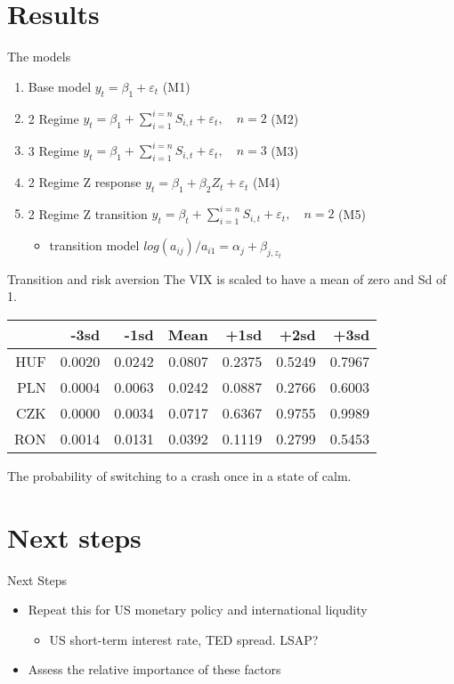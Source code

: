 \documentclass[14pt,xcolor=pdftex,dvipsnames,table]{beamer}
\begin{document}
\section{Results}
\begin{frame}{The models}
\begin{enumerate}[<+-| alert@+>]
\item Base model $y_t = \beta_1 + \varepsilon_t$ (M1)
\item 2 Regime $y_t = \beta_1 + \sum_{i=1}^{i=n}S_{i,t} + \varepsilon_t, \quad n = 2$ (M2) 
\item 3 Regime $y_t = \beta_1 + \sum_{i=1}^{i=n}S_{i,t} + \varepsilon_t, \quad n = 3$ (M3)
\item 2 Regime Z response $y_t = \beta_1 + \beta_2 Z_t + \varepsilon_t$ (M4)
\item 2 Regime Z transition $y_t = \beta_t + \sum_{i=1}^{i=n}S_{i,t} + \varepsilon_t, \quad n = 2$ (M5) 
\begin{itemize}
\item transition model $log(a_{ij})/ a_{i1} = \alpha_j +\beta_{j,z_t}$
\end{itemize}
\end{enumerate}
\end{frame}

\begin{frame}{Transition and risk aversion}
The VIX is scaled to have a mean of zero and Sd of 1.  
\begin{center}
\begin{tabular}{rrrrrrr}
  \hline
 & -3sd & -1sd & Mean & +1sd & +2sd & +3sd \\ 
  \hline
  HUF & 0.0020 &  0.0242 & 0.0807 & 0.2375 & 0.5249 & 0.7967 \\ 
  PLN & 0.0004 &  0.0063 & 0.0242 & 0.0887 & 0.2766 & 0.6003 \\ 
  CZK & 0.0000 &  0.0034 & 0.0717 & 0.6367 & 0.9755 & 0.9989 \\ 
  RON & 0.0014 &  0.0131 & 0.0392 & 0.1119 & 0.2799 & 0.5453  
\end{tabular}
\end{center}
The probability of switching to a crash once in a state of calm.
\end{frame}


\section{Next steps}
\begin{frame}{Next Steps}
\begin{itemize}[<+-| alert@+>]
\item Repeat this for US monetary policy and international liqudity
\begin{itemize}
\item US short-term interest rate, TED spread.  LSAP?
\end{itemize}
\item Assess the relative importance of these factors
\end{itemize}
\end{frame}
\end{document}
